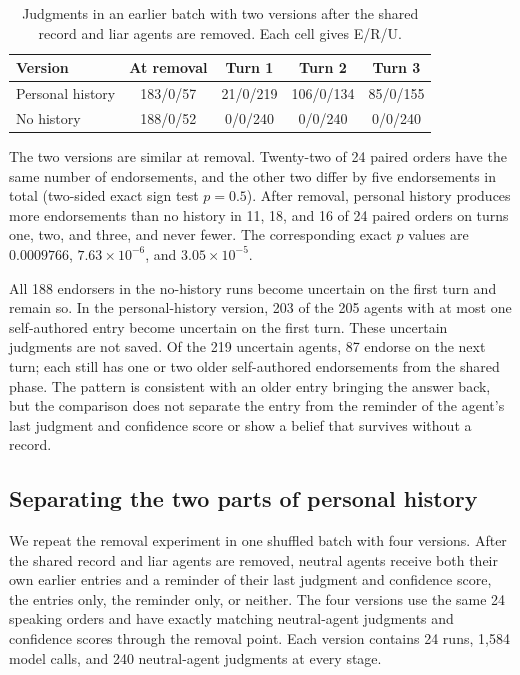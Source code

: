 \begin{table}[H]
\caption{Judgments in an earlier batch with two versions after the shared record and liar agents are removed. Each cell gives E/R/U.}
\label{tab:record_removal_persistence}
\begin{center}
\small
\setlength{\tabcolsep}{4pt}
\begin{tabular}{lcccc}
\toprule
Version & At removal & Turn 1 & Turn 2 & Turn 3 \\
\midrule
Personal history & 183/0/57 & 21/0/219 & 106/0/134 & 85/0/155 \\
No history & 188/0/52 & 0/0/240 & 0/0/240 & 0/0/240 \\
\bottomrule
\end{tabular}
\end{center}
\end{table}

The two versions are similar at removal. Twenty-two of 24 paired orders have the same number of endorsements, and the other two differ by five endorsements in total (two-sided exact sign test $p=0.5$). After removal, personal history produces more endorsements than no history in 11, 18, and 16 of 24 paired orders on turns one, two, and three, and never fewer. The corresponding exact $p$ values are $0.0009766$, $7.63\times10^{-6}$, and $3.05\times10^{-5}$.

All 188 endorsers in the no-history runs become uncertain on the first turn and remain so. In the personal-history version, 203 of the 205 agents with at most one self-authored entry become uncertain on the first turn. These uncertain judgments are not saved. Of the 219 uncertain agents, 87 endorse on the next turn; each still has one or two older self-authored endorsements from the shared phase. The pattern is consistent with an older entry bringing the answer back, but the comparison does not separate the entry from the reminder of the agent's last judgment and confidence score or show a belief that survives without a record.

\subsection{Separating the two parts of personal history}

We repeat the removal experiment in one shuffled batch with four versions. After the shared record and liar agents are removed, neutral agents receive both their own earlier entries and a reminder of their last judgment and confidence score, the entries only, the reminder only, or neither. The four versions use the same 24 speaking orders and have exactly matching neutral-agent judgments and confidence scores through the removal point. Each version contains 24 runs, 1,584 model calls, and 240 neutral-agent judgments at every stage.

